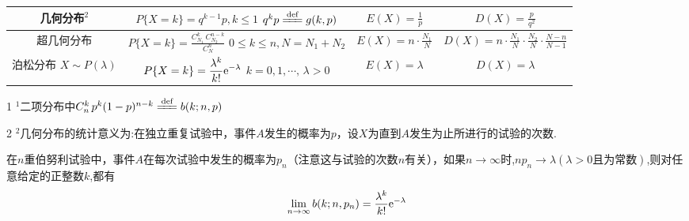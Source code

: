 \begin{table}[!htb]
{\begin{tabular}{cccc}
			\hline
			几何分布$^2$\index{JHFB@几何分布}
			& 
			\makecell[c]{$\displaystyle P\lbrace X = k\rbrace=q^{k-1}p,k\le 1$\\$q^kp\xlongequal{\text{def}}g(k,p)$ }
			& $\displaystyle E(X)=\frac{1}{p}$
			& $\displaystyle D(X)=\frac{p}{q^2}$\\
			\hline
			超几何分布\index{CJHFB@超几何分布}
			& 
			\makecell[c]{$\displaystyle P\lbrace X = k\rbrace=\frac{C_{N_1}^k\,C_{N_2}^{n-k}}{C_N^n}$\\$0 \le k\le n,N=N_1+N_2$ }
			& $\displaystyle E(X)=n\cdot \frac{N_1}{N}$
			& $\displaystyle D(X)=n\cdot \frac{N_1}{N}\cdot \frac{N_2}{N}\cdot\frac{N-n}{N-1}$\\
			\hline
			\makecell[c]{泊松分布\\$X\sim P(\lambda )$}\index{PSFB@泊松分布}
			& 
			\makecell[c]{$\displaystyle P\lbrace X = k\rbrace=\frac{\lambda^k }{k!}{\rm{e}}^{-\lambda }$\\$k=0,1,\cdots,\,\lambda >0$}
			& $\displaystyle E(X)=\lambda$
			& $\displaystyle D(X)=\lambda$\\
			\bottomrule[2pt]
		\end{tabular}
	}
\begin{tablenotes}
	\footnotesize
	\item[1] $^1$二项分布中$C_n^k\,p^k(1-p)^{n-k}\xlongequal{\text{def}}b(k;n,p)$
	\item[2] $^2$几何分布的统计意义为:在独立重复试验中，事件$A$发生的概率为$p$，设$X$为直到$A$发生为止所进行的试验的次数.
\end{tablenotes}
	\renewcommand{\arraystretch}{1}
	\label{常用的离散型分布及其数字特征}
\end{table} 

\theorem[泊松定理]
在$n$重伯努利试验中，事件$A$在每次试验中发生的概率为$p_n$（注意这与试验的次数$n$有关），如果$n\to \infty $时,$np_n\to \lambda(\lambda > 0\mbox{且为常数})$,则对任意给定的正整数$k$,都有
\begin{equation}
\lim\limits_{n\to \infty }b(k;n,p_n)=\frac{\lambda^k}{k!}{\rm{e}}^{-\lambda}
\end{equation}

